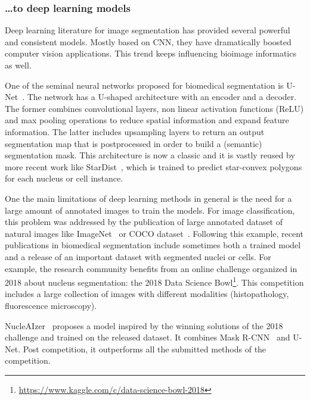 \subsubsection{\dots to deep learning models}

Deep learning literature for image segmentation has provided several powerful and consistent models.
Mostly based on \ac{CNN}, they have dramatically boosted computer vision applications.
This trend keeps influencing bioimage informatics as well.

One of the seminal neural networks proposed for biomedical segmentation is U-Net~\cite{Ronneberger_unet}.
The network has a U-shaped architecture with an encoder and a decoder.
The former combines convolutional layers, non linear activation functions (ReLU) and max pooling operations to reduce spatial information and expand feature information.
The latter includes upsampling layers to return an output segmentation map that is postprocessed in order to build a (semantic) segmentation mask.
This architecture is now a classic and it is vastly reused by more recent work like StarDist~\cite{schmidt2018}, which is trained to predict star-convex polygons for each nucleus or cell instance.

One the main limitations of deep learning methods in general is the need for a large amount of annotated images to train the models. For image classification, this problem was addressed by the publication of large annotated dataset of natural images like ImageNet~\cite{Deng_2009} or COCO dataset~\cite{Lin_2014}.
Following this example, recent publications in biomedical segmentation include sometimes both a trained model and a release of an important dataset with segmented nuclei or cells.
For example, the research community benefits from an online challenge organized in 2018 about nucleus segmentation: the 2018 Data Science Bowl\footnote{\url{https://www.kaggle.com/c/data-science-bowl-2018}}.
This competition includes a large collection of images with different modalities (histopathology, fluorescence microscopy).

NucleAIzer~\cite{hollandi_nucleaizer_2020} proposes a model inspired by the winning solutions of the 2018 challenge and trained on the released dataset.
It combines Mask R-CNN~\cite{He_2017_ICCV} and U-Net.
Post competition, it outperforms all the submitted methods of the competition.

